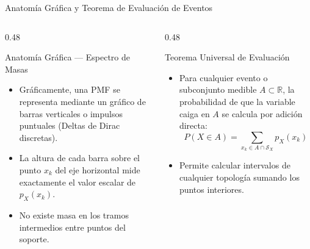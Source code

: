 \documentclass[10pt, aspectratio=169]{beamer}
\begin{document}
\begin{frame}{Anatomía Gráfica y Teorema de Evaluación de Eventos}
  \begin{columns}[T]
    \begin{column}{0.48\textwidth}
      \begin{block}{Anatomía Gráfica — Espectro de Masas}
        \small
        \begin{itemize}\itemsep=0.1cm
          \item Gráficamente, una PMF se representa mediante un gráfico de barras verticales o impulsos puntuales (Deltas de Dirac discretas).
          \item La altura de cada barra sobre el punto $x_k$ del eje horizontal mide exactamente el valor escalar de $p_X(x_k)$.
          \item No existe masa en los tramos intermedios entre puntos del soporte.
        \end{itemize}
      \end{block}
    \end{column}
    \begin{column}{0.48\textwidth}
      \begin{alertblock}{Teorema Universal de Evaluación}
        \small
        \begin{itemize}\itemsep=0.1cm
          \item Para cualquier evento o subconjunto medible $A \subset \mathbb{R}$, la probabilidad de que la variable caiga en $A$ se calcula por adición directa:
          $$P(X \in A) = \sum_{x_k \in A \cap \mathcal{S}_X} p_X(x_k)$$
          \item Permite calcular intervalos de cualquier topología sumando los puntos interiores.
        \end{itemize}
      \end{alertblock}
    \end{column}
  \end{columns}
\end{frame}
\end{document}
